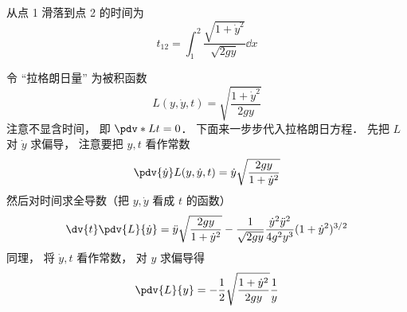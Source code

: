 

从点 1 滑落到点 2 的时间为
\begin{equation}
t_{12} = \int_1^2 \frac{\sqrt{1+\dot{y}^2}}{\sqrt{2gy}} \dd{x}
\end{equation}

令 “拉格朗日量” 为被积函数
\begin{equation}
L(y, \dot{y}, t) = \sqrt{\frac{1 + \dot{y}^2}{2gy}}
\end{equation}
注意不显含时间， 即 $\pdv*{L}{t} = 0$． 下面来一步步代入拉格朗日方程． 先把 $L$ 对 $\dot{y}$ 求偏导， 注意要把 $y, t$ 看作常数
\begin{equation}
\pdv{\dot{y}}L(y, \dot{y}, t) = \dot y\sqrt{\frac{2gy}{1+\dot{y}^2}}
\end{equation}
然后对时间求全导数（把 $y, \dot{y}$ 看成 $t$ 的函数）
\begin{equation}
\dv{t}\pdv{L}{\dot{y}} = \ddot{y}\sqrt{\frac{2gy}{1+\dot{y}^2}} - \frac{1}{\sqrt{2gy}}\frac{\dot{y}^2\ddot{y}^2}{4g^2y^3}(1+\dot{y}^2)^{3/2}
\end{equation}
同理， 将 $\dot y, t$ 看作常数， 对 $y$ 求偏导得
\begin{equation}
\pdv{L}{y} = -\frac{1}{2} \sqrt{\frac{1 + \dot{y}^2}{2gy}} \frac{1}{y}
\end{equation}


